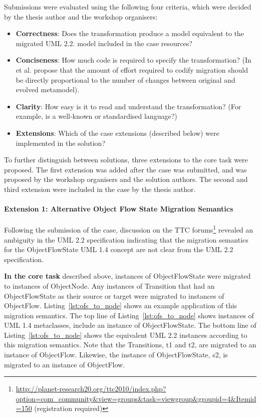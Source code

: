 Submissions were evaluated using the following four criteria, which were decided by the thesis author and the workshop organisers:

\begin{itemize}
	\item \textbf{Correctness}: Does the transformation produce a model equivalent to the migrated UML 2.2. model included in the case resources?
	\item \textbf{Conciseness}: How much code is required to specify the transformation? (In \cite{sprinkle04domain} et al. propose that the amount of effort required to codify migration should be directly proportional to the number of changes between original and evolved metamodel).
		\item \textbf{Clarity}: How easy is it to read and understand the transformation? (For example, is a well-known or standardised language?)
		\item \textbf{Extensions}: Which of the case extensions (described below) were implemented in the solution?
\end{itemize}

To further distinguish between solutions, three extensions to the core task were proposed. The first extension was added after the case was submitted, and was proposed by the workshop organisers and the solution authors. The second and third extension were included in the case by the thesis author. 

\paragraph{Extension 1: Alternative Object Flow State Migration Semantics}
\label{sub:object_flow_states}
Following the submission of the case, discussion on the TTC forums\footnote{\url{http://planet-research20.org/ttc2010/index.php?option=com_community&view=groups&task=viewgroup&groupid=4&Itemid=150} (registration required)} revealed an ambiguity in the UML 2.2 specification indicating that the migration semantics for the ObjectFlowState UML 1.4 concept are not clear from the UML 2.2 specification.

\textbf{In the core task} described above, instances of ObjectFlowState were migrated to instances of ObjectNode. Any instances of Transition that had an ObjectFlowState as their source or target were migrated to instances of ObjectFlow. Listing~\ref{lst:ofs_to_node} shows an example application of this migration semantics. The top line of Listing~\ref{lst:ofs_to_node} shows instances of UML 1.4 metaclasses, include an instance of ObjectFlowState. The bottom line of Listing~\ref{lst:ofs_to_node} shows the equivalent UML 2.2 instances according to this migration semantics. Note that the Transitions, t1 and t2, are migrated to an instance of ObjectFlow. Likewise, the instance of ObjectFlowState, s2, is migrated to an instance of ObjectFlow.

